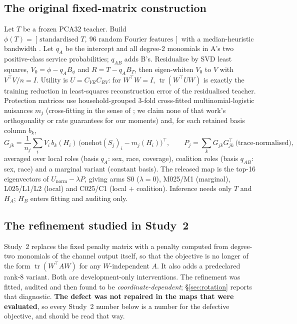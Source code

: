 \documentclass[10pt]{article}
\begin{document}
\subsection{The original fixed-matrix construction}

Let $T$ be a frozen PCA32 teacher. Build $\phi(T)=[\,\text{standardised }T,\ 96 \text{ random
Fourier features}\,]$ with a median-heuristic bandwidth \citep{rahimi2007random}. Let $q_A$ be the
intercept and all degree-2 monomials in A's two positive-class service probabilities; $q_{AB}$ adds
B's. Residualise by SVD least squares, $V_0=\phi-q_A B_\phi$ and $R=T-q_A B_T$, then eigen-whiten
$V_0$ to $V$ with $V^\top V/n=I$. Utility is $U=C_{VR}C_{RV}$: for $W^\top W=I$,
$\operatorname{tr}(W^\top UW)$ is exactly the training reduction in least-squares reconstruction
error of the residualised teacher. Protection matrices use household-grouped 3-fold cross-fitted
multinomial-logistic nuisances $m_j$ (cross-fitting in the sense of \citealp{chernozhukov2016dml};
we claim none of that work's orthogonality or rate guarantees for our moments) and, for each
retained basis column $b_k$,
\[
G_{jk}=\frac{1}{n_j}\sum_i V_i\, b_k(H_i)\,\bigl(\mathrm{onehot}(S_j)_i-m_j(H_i)\bigr)^{\!\top},
\qquad P_j=\textstyle\sum_k G_{jk}G_{jk}^{\top}\ \text{(trace-normalised)},
\]
averaged over local roles (basis $q_A$: sex, race, coverage), coalition roles (basis $q_{AB}$: sex,
race) and a marginal variant (constant basis). The released map is the top-16 eigenvectors of
$U_{\mathrm{norm}}-\lambda P$, giving arms S0 ($\lambda=0$), M025/M1 (marginal), L025/L1/L2 (local)
and C025/C1 (local $+$ coalition). Inference needs only $T$ and $H_A$; $H_B$ enters fitting and
auditing only.

\subsection{The refinement studied in Study~2}
\label{sec:refinement}

Study~2 replaces the fixed penalty matrix with a penalty computed from degree-two monomials of the
channel output itself, so that the objective is no longer of the form
$\operatorname{tr}(W^\top AW)$ for any $W$-independent $A$. It also adds a predeclared rank-8
variant. Both are development-only interventions. The refinement was fitted, audited and then found
to be \emph{coordinate-dependent}; \S\ref{sec:rotation} reports that diagnostic. \textbf{The defect
was not repaired in the maps that were evaluated}, so every Study~2 number below is a number for
the defective objective, and should be read that way.
\end{document}
